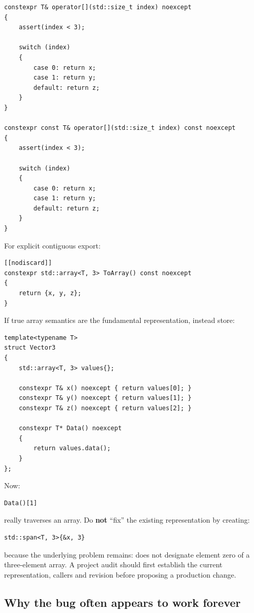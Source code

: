 \begin{verbatim}
constexpr T& operator[](std::size_t index) noexcept
{
    assert(index < 3);

    switch (index)
    {
        case 0: return x;
        case 1: return y;
        default: return z;
    }
}

constexpr const T& operator[](std::size_t index) const noexcept
{
    assert(index < 3);

    switch (index)
    {
        case 0: return x;
        case 1: return y;
        default: return z;
    }
}
\end{verbatim}

For explicit contiguous export:

\begin{verbatim}
[[nodiscard]]
constexpr std::array<T, 3> ToArray() const noexcept
{
    return {x, y, z};
}
\end{verbatim}

If true array semantics are the fundamental representation, instead store:

\begin{verbatim}
template<typename T>
struct Vector3
{
    std::array<T, 3> values{};

    constexpr T& x() noexcept { return values[0]; }
    constexpr T& y() noexcept { return values[1]; }
    constexpr T& z() noexcept { return values[2]; }

    constexpr T* Data() noexcept
    {
        return values.data();
    }
};
\end{verbatim}

Now:

\begin{verbatim}
Data()[1]
\end{verbatim}

really traverses an array. Do \textbf{not} ``fix'' the existing representation by creating:

\begin{verbatim}
std::span<T, 3>{&x, 3}
\end{verbatim}

because the underlying problem remains:  does not designate element zero of a three-element  array. A project audit should first establish the current representation, callers and revision before proposing a production change.

\subsection{Why the bug often appears to work forever}\label{01-foundations-i-ch003-why-the-bug-often-appears-to-work-forever}

